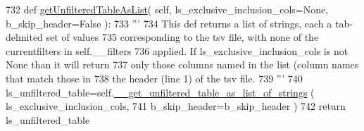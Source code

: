 \begin{DoxyCode}
732     \textcolor{keyword}{def }\hyperlink{classnegui_1_1pgneestimationtablefilemanager_1_1NeEstimationTableFileManager_ad03d8c1689963627115bfa2dbfc2674b}{getUnfilteredTableAsList}( self, ls\_exclusive\_inclusion\_cols=None, 
      b\_skip\_header=False ):
733         \textcolor{stringliteral}{'''}
734 \textcolor{stringliteral}{        This def returns a list of strings, each a tab-delmited set of values}
735 \textcolor{stringliteral}{        corresponding to the tsv file, with none of the currentfilters in self.\_\_filters}
736 \textcolor{stringliteral}{        applied.  If ls\_exclusive\_inclusion\_cols is not None than it will return}
737 \textcolor{stringliteral}{        only those columns named in the list (column names that match those in }
738 \textcolor{stringliteral}{        the header (line 1) of the tsv file.}
739 \textcolor{stringliteral}{        '''}
740         ls\_unfiltered\_table=self.\hyperlink{classnegui_1_1pgneestimationtablefilemanager_1_1NeEstimationTableFileManager_ab012bdbb260f12c0e9e4f64a0e138acb}{\_\_get\_unfiltered\_table\_as\_list\_of\_strings}
      ( ls\_exclusive\_inclusion\_cols, 
741                                                                                 b\_skip\_header=b\_skip\_header
       )
742         \textcolor{keywordflow}{return} ls\_unfiltered\_table
\end{DoxyCode}
